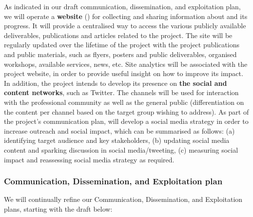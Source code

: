 As indicated in our draft communication, dissemination, and exploitation plan, we will operate a \textbf{website}
() for collecting and sharing information about \TheProject and its progress.
It will provide a centralised way to access the various publicly available deliverables, publications
and articles related to the project. The site will be regularly updated over the lifetime of the project
with the project publications and public materials, such as flyers, posters and
public deliverables, organised workshops, available services, news, etc.
Site analytics will be associated with the project website, in order
to provide useful insight on how to improve its impact. In addition, the project intends to
develop its presence on \textbf{the social and content
networks}, such as Twitter. The channels will be used for interaction
with the professional community as well as the general public
(differentiation on the content per channel based on the target group wishing to address).
As part of the project's communication plan, \TheProject will develop a social media strategy
in order to increase outreach and social impact, which can be summarised as follows: (a) identifying target
audience and key stakeholders, (b) updating social media content and sparking
discussion in social media/tweeting, (c) measuring social impact and reassessing
social media strategy as required.

\subsubsection{Communication, Dissemination, and Exploitation plan}

We will continually refine our Communication, Dissemination, and Exploitation plans, starting with the draft below:


